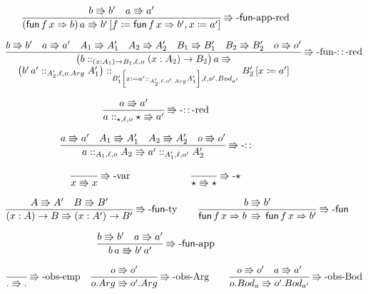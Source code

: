 \begin{figure}
\[
\frac{b\Rrightarrow b'\quad a\Rrightarrow a'}{\left(\mathsf{fun}\,f\,x\Rightarrow b\right)a\Rrightarrow b'\left[f\coloneqq\mathsf{fun}\,f\,x\Rightarrow b',x\coloneqq a'\right]}
\operatorname{\Rrightarrow-\mathsf{fun}-app-red}
\]
 
\[
\frac{b\Rrightarrow b'\quad a\Rrightarrow a'\quad A_{1}\Rrightarrow A_{1}'\quad A_{2}\Rrightarrow A_{2}'\quad B_{1}\Rrightarrow B_{1}'\quad B_{2}\Rrightarrow B_{2}'\quad o\Rrightarrow o'}{\begin{array}{c}
\left(b::_{\left(x:A_{1}\right)\rightarrow B_{1},\ell ,o}\left(x:A_{2}\right)\rightarrow B_{2}\right)a\Rrightarrow\\
\left(b'\,a'::_{A_{2}',\ell,o.Arg}A_{1}'\right)::_{B_{1}'\left[x\coloneqq a'::_{A_{2}',\ell,o'.Arg}A_{1}'\right],\ell ,o'.Bod_{a'} }B_{2}'\left[x\coloneqq a'\right]
\end{array}}
\operatorname{\Rrightarrow-fun-::-red}
\]
 
\[
\frac{a\Rrightarrow a'}{a::_{\star,\ell,o}\star\Rrightarrow a'}
\operatorname{\Rrightarrow-::-red}
\]

\[
\frac{a\Rrightarrow a'\quad A_{1}\Rrightarrow A_{1}'\quad A_{2}\Rrightarrow A_{2}'\quad o\Rrightarrow o'}{a::_{A_{1},\ell ,o}A_{2}\Rrightarrow a'::_{A_{1}',\ell ,o'}A_{2}'}
\operatorname{\Rrightarrow-::}
\]

\begin{align*}
\frac{\,}{x\Rrightarrow x}
\operatorname{\Rrightarrow-var} \quad \quad \quad & \quad \quad \quad \frac{\,}{\star\Rrightarrow\star}
\operatorname{\Rrightarrow-\star}\\
\end{align*}

\begin{align*}
\frac{A\Rrightarrow A'\quad B\Rrightarrow B'}{\left(x:A\right)\rightarrow B\Rrightarrow\left(x:A'\right)\rightarrow B'}
\operatorname{\Rrightarrow-\mathsf{fun}-ty} \quad & \quad \frac{b\Rrightarrow b'}{\mathsf{fun}\,f\,x\Rightarrow b\,\Rrightarrow\,\mathsf{fun}\,f\,x\Rightarrow b'}
\operatorname{\Rrightarrow-\mathsf{fun}}\\
\end{align*}

\[
\frac{b\Rrightarrow b'\quad a\Rrightarrow a'}{b\,a\Rrightarrow b'\,a'}
\operatorname{\Rrightarrow-\mathsf{fun}-app}
\]
 
\begin{align*}
  \frac{\,}{.\Rrightarrow.}
\operatorname{\Rrightarrow-obs-emp} &  \quad  \frac{o\Rrightarrow o'}{o.Arg\Rrightarrow o'.Arg}
\operatorname{\Rrightarrow-obs-Arg} \quad  &  \frac{o\Rrightarrow o'\quad a\Rrightarrow a'}{o.Bod_a \Rrightarrow o'.Bod_{a'}}
\operatorname{\Rrightarrow-obs-Bod}  \\
\end{align*}


\end{figure}
